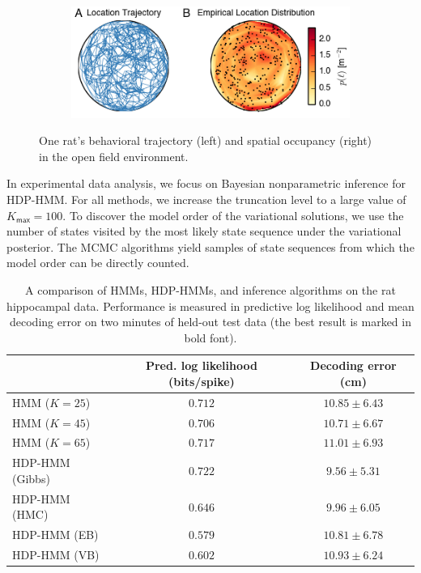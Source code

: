 \begin{figure}
\centering
\begin{subfigure}[t]{\textwidth}
\centering
\includegraphics[width=4in]{figures/ch7/Fig4}
\end{subfigure}
\caption[Trajectory of the freely foraging rat during hippocampal
  recording]{One rat's behavioral trajectory (left) and spatial
  occupancy (right) in the open field environment. }
\label{fig4}
\end{figure}

In experimental data analysis, we focus on Bayesian nonparametric
inference for HDP-HMM.  For all methods, we increase the truncation
level to a large value of $K_{\mathsf{max}}=100$.  To discover the model order of the
variational solutions, we use the number of states visited by the most
likely state sequence under the variational posterior. The MCMC
algorithms yield samples of state sequences from which the model order
can be directly counted.


\begin{table}[b]
  \centering
  \caption[Comparison of models on real hippocampal data]{A comparison
    of HMMs, HDP-HMMs, and inference algorithms on the rat hippocampal
    data. Performance is measured in predictive log likelihood and
    mean decoding error on two minutes of held-out test data (the best
    result is marked in bold font).}
  \begin{tabular}{l|cc}
    & Pred. log likelihood (bits/spike) & Decoding error (cm) \\
    \hline 
    HMM ($K=25$)         & $0.712$ & $10.85 \pm 6.43$ \\
    HMM ($K=45$)         & $0.706$ & $10.71 \pm 6.67$\\
    HMM ($K=65$)         & $0.717$ & $11.01 \pm 6.93$\\
    HDP-HMM (Gibbs)      & $\mathbf{0.722}$ & $\mathbf{9.56 \pm 5.31}$ \\
    HDP-HMM (HMC)        & $0.646$ & $9.96 \pm 6.05$\\
    HDP-HMM (EB)         & $0.579$ & $10.81 \pm 6.78$\\
    HDP-HMM (VB)         & $0.602$ & $10.93 \pm 6.24$
  \end{tabular}
  \label{tab:hipp_err}
\end{table}

